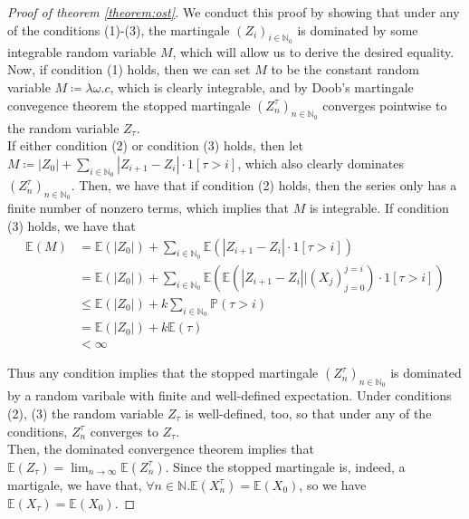 	\begin{proof}[Proof of theorem \ref{theorem:ost}]
		We conduct this proof by showing that under any of the conditions (1)-(3), the
		martingale $(Z_i)_{i\in \mathbb{N}_0}$ is dominated by some integrable random 
		variable $M$, which will allow us to derive the desired equality. \\
		Now, if condition (1) holds, then we can set $M$ to be the constant random 
		variable $M \coloneqq \lambda \omega . c$, which is clearly integrable, and
		by Doob's martingale convegence theorem the stopped martingale 
		$(Z^\tau_n)_{n\in\mathbb{N}_0}$ converges pointwise to the random variable 
		$Z_\tau$.\\
		If either condition (2) or condition (3) holds, then let $M \coloneqq |Z_0| 
		+ \sum_{i\in\mathbb{N}_0} |Z_{i+1}-Z_i| \cdot 1[\tau > i]$, which also clearly 
		dominates $(Z_n^\tau)_{n\in\mathbb{N}_0}$. Then, we have that if condition (2) 
		holds, then the series only has a finite number of nonzero terms, which implies
		that $M$ is integrable. If condition (3) holds, we have that
		\begin{align*}
			\mathbb{E}(M) &= \mathbb{E}(|Z_0|) + \sum_{i\in\mathbb{N}_0} \mathbb{E}(
			|Z_{i+1}-Z_{i}| \cdot 1[\tau>i]) \\
			&= \mathbb{E}(|Z_0|) + \sum_{i\in\mathbb{N}_0} \mathbb{E}\left(\mathbb{E}
			\left(|Z_{i+1}-Z_{i}|\big|(X_j)_{j=0}^{j=i}\right)\cdot1[\tau>i]\right) \\
			&\leq \mathbb{E}(|Z_0|) + k \sum_{i\in\mathbb{N}_0} \mathbb{P}(\tau > i) \\
			&= \mathbb{E}(|Z_0|) + k \mathbb{E}(\tau) \\
			&< \infty
		\end{align*}

		Thus any condition implies that the stopped martingale 
		$(Z_n^\tau)_{n\in\mathbb{N}_0}$ is dominated by a random varibale with finite and 
		well-defined expectation. Under conditions (2), (3) the random variable $Z_\tau$ is
		well-defined, too, so that under any of the conditions, $Z^\tau_n$ converges to 
		$Z_\tau$. \\
		Then, the dominated convergence theorem implies that $\mathbb{E}(Z_\tau) = 
		\lim_{n\rightarrow\infty}\mathbb{E}(Z_n^\tau)$. Since the stopped martingale is, 
		indeed, a martigale, we have that, $\forall n \in \mathbb{N}. \mathbb{E}(X_n^\tau) 
		= \mathbb{E}(X_0)$, so we have $\mathbb{E}(X_\tau) = \mathbb{E}(X_0)$.
	\end{proof}
	\begin{comment}
		It is worth pointing out that a similar result applies to super- and submartingales%
		, obviously with the relevant inequality instead.
	\end{comment}
	

